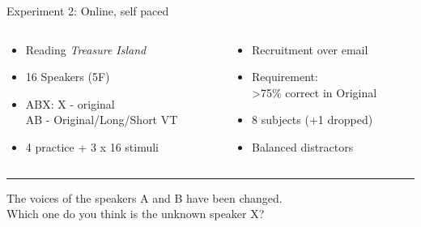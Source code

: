 \documentclass[xcolor={dvipsnames}]{beamer}
\begin{document}
\begin{frame}{Experiment 2: Online, self paced}
\begin{columns}
\begin{column}{0.48\textwidth}
\begin{itemize}
    \item Reading \textit{Treasure Island} \cite{pacorpus18}
    \item 16 Speakers (5F)
    \item ABX: X - original\\AB - Original/Long/Short VT
    \item 4 practice + 3 x 16 stimuli
\end{itemize}
\end{column}
\begin{column}{0.48\textwidth}
\begin{itemize}
    \item Recruitment over email
    \item Requirement: \\>75\% correct in Original
    \item 8 subjects (+1 dropped)
    \item Balanced distractors
\end{itemize}
\end{column}
\end{columns}
\vskip 0.5cm
\hrule
\vskip 0.2cm
The voices of the speakers A and B have been changed. \\
Which one do you think is the unknown speaker X?
\vskip 0.2cm


\end{frame}
\end{document}
